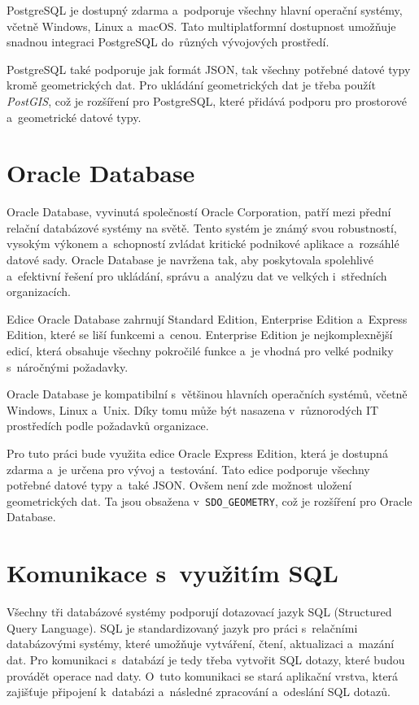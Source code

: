 PostgreSQL je dostupný zdarma a~podporuje všechny hlavní operační systémy, včetně Windows, Linux a~macOS. 
Tato multiplatformní dostupnost umožňuje snadnou integraci PostgreSQL do~různých vývojových prostředí.
\cite{postgresql}

PostgreSQL také podporuje jak formát JSON, tak všechny potřebné datové typy kromě geometrických dat.
Pro ukládání geometrických dat je třeba použít \textit{PostGIS}, což je rozšíření pro PostgreSQL, které přidává
podporu pro prostorové a~geometrické datové typy.

\section{Oracle Database}
Oracle Database, vyvinutá společností Oracle Corporation, patří mezi přední relační 
databázové systémy na světě. Tento systém je známý svou robustností, vysokým výkonem 
a~schopností zvládat kritické podnikové aplikace a~rozsáhlé datové sady. Oracle Database 
je navržena tak, aby poskytovala spolehlivé a~efektivní řešení pro ukládání, správu 
a~analýzu dat ve velkých i~středních organizacích.

Edice Oracle Database zahrnují Standard Edition, Enterprise Edition a~Express Edition,
které se liší funkcemi a~cenou. Enterprise Edition je nejkomplexnější edicí, která
obsahuje všechny pokročilé funkce a~je vhodná pro velké podniky s~náročnými požadavky.

Oracle Database je kompatibilní s~většinou hlavních operačních systémů, včetně Windows, 
Linux a~Unix. Díky tomu může být nasazena v~různorodých IT prostředích podle požadavků organizace.
\cite{oracle_database}

Pro tuto práci bude využita edice Oracle Express Edition, která je dostupná zdarma a~je určena pro vývoj a~testování.
Tato edice podporuje všechny potřebné datové typy a~také JSON. Ovšem není zde možnost 
uložení geometrických dat. Ta jsou obsažena v~\texttt{SDO\_GEOMETRY}, což je rozšíření pro Oracle Database.

\section{Komunikace s~využitím SQL}
Všechny tři databázové systémy podporují dotazovací jazyk SQL (Structured Query Language).
SQL je standardizovaný jazyk pro práci s~relačními databázovými systémy, které umožňuje vytváření, čtení, aktualizaci a~mazání dat.
Pro komunikaci s~databází je tedy třeba vytvořit SQL dotazy, které budou provádět operace nad daty.
O~tuto komunikaci se stará aplikační vrstva, která zajišťuje připojení k~databázi a~následné zpracování a~odeslání SQL dotazů.

